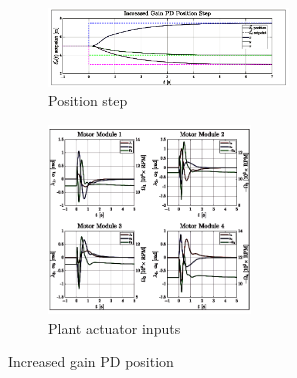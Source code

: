 \begin{figure}[htbp]
\vspace{-12pt}
\centering
\begin{subfigure}{\textwidth}
\centering
\includegraphics[width=0.7\textwidth]{graphs/PD_Position_Gain_Step}
\vspace{-6pt}
\caption{Position step}
\label{fig:PD_Position_Gain_Step}
\end{subfigure}
\begin{subfigure}{\textwidth}
\vspace{-4pt}
\centering
\includegraphics[width=0.59\textwidth]{graphs/PD_Position_Gain_Input}
\vspace{-8pt}
\caption{Plant actuator inputs}
\label{fig:PD_Position_Gain_Input}
\end{subfigure}
\vspace{-8pt}
\caption{Increased gain PD position}
\vspace{-36pt}
\end{figure}
